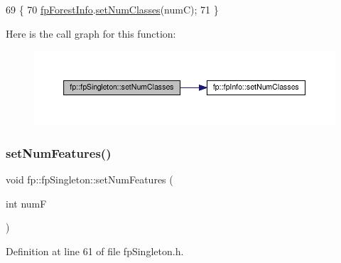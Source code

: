 \begin{DoxyCode}
69                                                \{
70                 \hyperlink{classfp_1_1fpSingleton_a85965009befa72a749ae498fa5b6ccfa}{fpForestInfo}.\hyperlink{classfp_1_1fpInfo_a3598d1ab13bf05b53858b1ca8c44fa68}{setNumClasses}(numC);
71             \}
\end{DoxyCode}
Here is the call graph for this function\+:\nopagebreak
\begin{figure}[H]
\begin{center}
\leavevmode
\includegraphics[width=350pt]{classfp_1_1fpSingleton_a499e7cef6b463cc24590d05a0d0e6e1c_cgraph}
\end{center}
\end{figure}
\mbox{\label{classfp_1_1fpSingleton_a5a35867349f6d172f77af7026fdaecbe}} 
\subsubsection{\texorpdfstring{set\+Num\+Features()}{setNumFeatures()}}
{\footnotesize\ttfamily void fp\+::fp\+Singleton\+::set\+Num\+Features (\begin{DoxyParamCaption}\item[{int}]{numF }\end{DoxyParamCaption})\hspace{0.3cm}{\ttfamily [inline]}}



Definition at line 61 of file fp\+Singleton.\+h.


